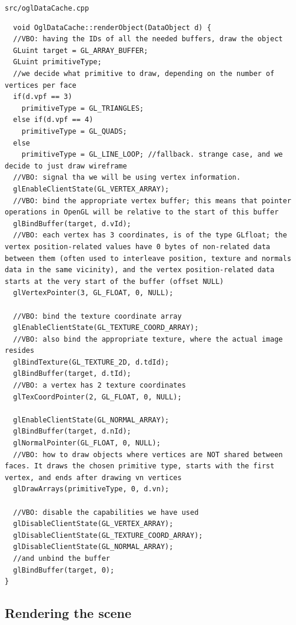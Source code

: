 \documentclass{scrartcl}
\begin{document}
\begin{enumerate}
  
\end{enumerate}


\lstinline{src/oglDataCache.cpp}
\begin{lstlisting}
  void OglDataCache::renderObject(DataObject d) {
  //VBO: having the IDs of all the needed buffers, draw the object
  GLuint target = GL_ARRAY_BUFFER;
  GLuint primitiveType;
  //we decide what primitive to draw, depending on the number of vertices per face
  if(d.vpf == 3)
    primitiveType = GL_TRIANGLES;
  else if(d.vpf == 4)
    primitiveType = GL_QUADS;
  else
    primitiveType = GL_LINE_LOOP; //fallback. strange case, and we decide to just draw wireframe
  //VBO: signal tha we will be using vertex information.
  glEnableClientState(GL_VERTEX_ARRAY);
  //VBO: bind the appropriate vertex buffer; this means that pointer operations in OpenGL will be relative to the start of this buffer
  glBindBuffer(target, d.vId);
  //VBO: each vertex has 3 coordinates, is of the type GLfloat; the vertex position-related values have 0 bytes of non-related data between them (often used to interleave position, texture and normals data in the same vicinity), and the vertex position-related data starts at the very start of the buffer (offset NULL)
  glVertexPointer(3, GL_FLOAT, 0, NULL);

  //VBO: bind the texture coordinate array
  glEnableClientState(GL_TEXTURE_COORD_ARRAY);
  //VBO: also bind the appropriate texture, where the actual image resides
  glBindTexture(GL_TEXTURE_2D, d.tdId);
  glBindBuffer(target, d.tId);
  //VBO: a vertex has 2 texture coordinates 
  glTexCoordPointer(2, GL_FLOAT, 0, NULL);

  glEnableClientState(GL_NORMAL_ARRAY);
  glBindBuffer(target, d.nId);
  glNormalPointer(GL_FLOAT, 0, NULL);
  //VBO: how to draw objects where vertices are NOT shared between faces. It draws the chosen primitive type, starts with the first vertex, and ends after drawing vn vertices
  glDrawArrays(primitiveType, 0, d.vn);

  //VBO: disable the capabilities we have used
  glDisableClientState(GL_VERTEX_ARRAY);
  glDisableClientState(GL_TEXTURE_COORD_ARRAY);
  glDisableClientState(GL_NORMAL_ARRAY);
  //and unbind the buffer
  glBindBuffer(target, 0);
}
\end{lstlisting}

\subsection{Rendering the scene}
\end{document}
